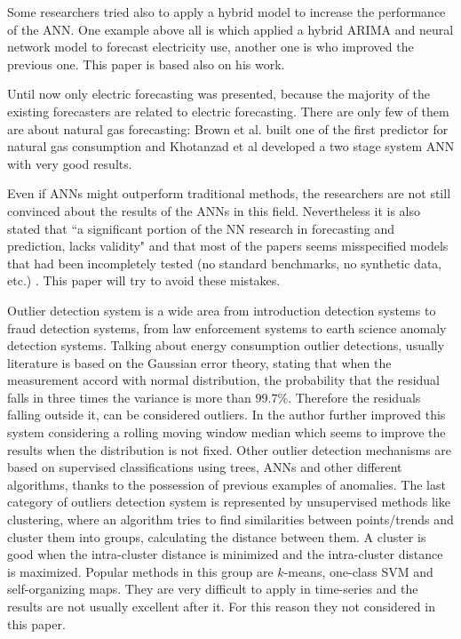 \documentclass{sig-alternate-sigmod07}
\begin{document}
Some researchers tried also to apply a hybrid model to increase the performance of the ANN. One example above all is \cite{zhang2003time} which applied a hybrid ARIMA and neural network model to forecast electricity use, another one is \cite{khashei2010artificial} who improved the previous one. This paper is based also on his work.

Until now only electric forecasting was presented, because the majority of the existing forecasters are related to electric forecasting. There are only few of them are about natural gas forecasting: Brown et al.\cite{brown1995development} built one of the first predictor for natural gas consumption and Khotanzad et al \cite{khotanzad2000combination} developed a two stage system ANN with very good results.

Even if ANNs might outperform traditional methods, the researchers are not still convinced about the results of the ANNs in this field. Nevertheless it is also stated that ``a significant portion of the NN research in forecasting and prediction, lacks validity" \cite{adya1998ective} and that most of the papers seems misspecified models that had been incompletely tested (no standard benchmarks, no synthetic data, etc.) \cite{hippert2001neural}. This paper will try to avoid these mistakes.

Outlier detection system is a wide area from introduction detection systems to fraud detection systems, from law enforcement systems to earth science anomaly detection systems. Talking about energy consumption outlier detections, usually literature is based on the Gaussian error theory, stating that when the measurement accord with normal distribution, the probability that the residual falls in three times the variance is more than $99.7\%$. Therefore the residuals falling outside it, can be considered outliers. In \cite{ferdowsi2013neural} the author further improved this system considering a rolling moving window median which seems to improve the results when the distribution is not fixed. Other outlier detection mechanisms are based on supervised classifications using trees, ANNs and other different algorithms, thanks to the possession of previous examples of anomalies.
The last category of outliers detection system is represented by unsupervised methods like clustering, where an algorithm tries to find similarities between points/trends and cluster them into groups, calculating the distance between them. A cluster is good when the intra-cluster distance is minimized and the intra-cluster distance is maximized. Popular methods in this group are $k$-means, one-class SVM and self-organizing maps. They are very difficult to apply in time-series and the results are not usually excellent after it. For this reason they not considered in this paper.
\end{document}
